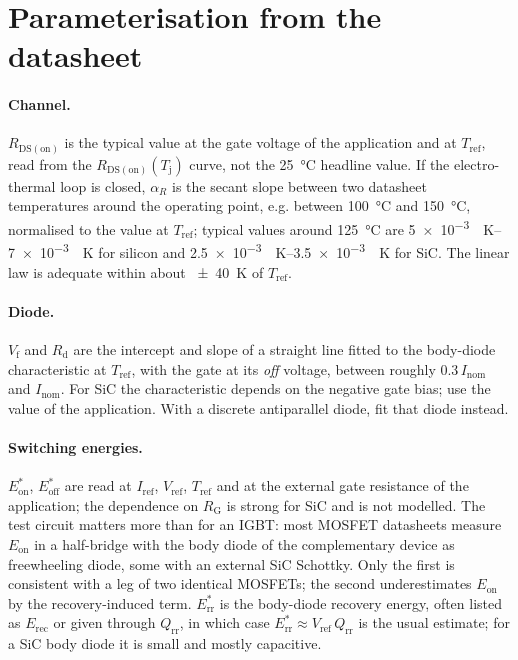 \documentclass[11pt,a4paper]{article}
\newcommand{\Eon}{E_{\mathrm{on}}}
\newcommand{\Eoff}{E_{\mathrm{off}}}
\newcommand{\Err}{E_{\mathrm{rr}}}
\newcommand{\Rdson}{R_{\mathrm{DS(on)}}}
\newcommand{\Tj}{T_{\mathrm{j}}}
\begin{document}
\section{Parameterisation from the datasheet}
\label{sec:param}

\paragraph{Channel.} $\Rdson$ is the typical value at the gate voltage of the
application and at $T_\mathrm{ref}$, read from the $\Rdson(\Tj)$ curve, not the
\SI{25}{\celsius} headline value. If the electro-thermal loop is closed,
$\alpha_R$ is the secant slope between two datasheet temperatures around the
operating point, e.g. between \SI{100}{\celsius} and \SI{150}{\celsius},
normalised to the value at $T_\mathrm{ref}$; typical values around
\SI{125}{\celsius} are \SIrange{5e-3}{7e-3}{\per\kelvin} for silicon and
\SIrange{2.5e-3}{3.5e-3}{\per\kelvin} for SiC. The linear law is adequate
within about \SI{\pm 40}{\kelvin} of $T_\mathrm{ref}$.

\paragraph{Diode.} $V_\mathrm{f}$ and $R_\mathrm{d}$ are the intercept and
slope of a straight line fitted to the body-diode characteristic at
$T_\mathrm{ref}$, with the gate at its \emph{off} voltage, between roughly
$0.3\,I_\mathrm{nom}$ and $I_\mathrm{nom}$. For SiC the characteristic depends
on the negative gate bias; use the value of the application. With a discrete
antiparallel diode, fit that diode instead.

\paragraph{Switching energies.} $\Eon^\ast$, $\Eoff^\ast$ are read at
$I_\mathrm{ref}$, $V_\mathrm{ref}$, $T_\mathrm{ref}$ and at the external gate
resistance of the application; the dependence on $R_\mathrm{G}$ is strong for
SiC and is not modelled. The test circuit matters more than for an IGBT: most
MOSFET datasheets measure $\Eon$ in a half-bridge with the body diode of the
complementary device as freewheeling diode, some with an external SiC Schottky.
Only the first is consistent with a leg of two identical MOSFETs; the second
underestimates $\Eon$ by the recovery-induced term. $\Err^\ast$ is the
body-diode recovery energy, often listed as $E_\mathrm{rec}$ or given through
$Q_\mathrm{rr}$, in which case $\Err^\ast \approx V_\mathrm{ref}\,Q_\mathrm{rr}$
is the usual estimate; for a SiC body diode it is small and mostly capacitive.
\end{document}
